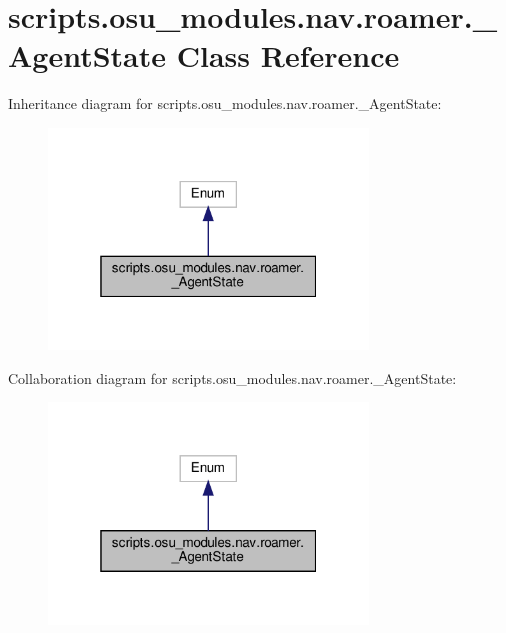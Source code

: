 \hypertarget{classscripts_1_1osu__modules_1_1nav_1_1roamer_1_1__AgentState}{}\section{scripts.\+osu\+\_\+modules.\+nav.\+roamer.\+\_\+\+Agent\+State Class Reference}
\label{classscripts_1_1osu__modules_1_1nav_1_1roamer_1_1__AgentState}


Inheritance diagram for scripts.\+osu\+\_\+modules.\+nav.\+roamer.\+\_\+\+Agent\+State\+:
\nopagebreak
\begin{figure}[H]
\begin{center}
\leavevmode
\includegraphics[width=241pt]{dc/dc3/classscripts_1_1osu__modules_1_1nav_1_1roamer_1_1__AgentState__inherit__graph}
\end{center}
\end{figure}


Collaboration diagram for scripts.\+osu\+\_\+modules.\+nav.\+roamer.\+\_\+\+Agent\+State\+:
\nopagebreak
\begin{figure}[H]
\begin{center}
\leavevmode
\includegraphics[width=241pt]{d6/d0f/classscripts_1_1osu__modules_1_1nav_1_1roamer_1_1__AgentState__coll__graph}
\end{center}
\end{figure}

